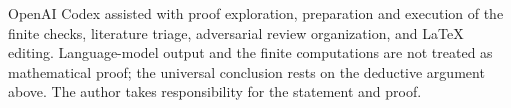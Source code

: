 \documentclass[11pt]{article}
\begin{document}
OpenAI Codex assisted with proof exploration, preparation and execution of
the finite checks, literature triage, adversarial review organization, and
LaTeX editing.  Language-model output and the finite computations are not
treated as mathematical proof; the universal conclusion rests on the
deductive argument above.  The author takes responsibility for the statement
and proof.


\begin{sloppypar}

\end{sloppypar}
\end{document}
